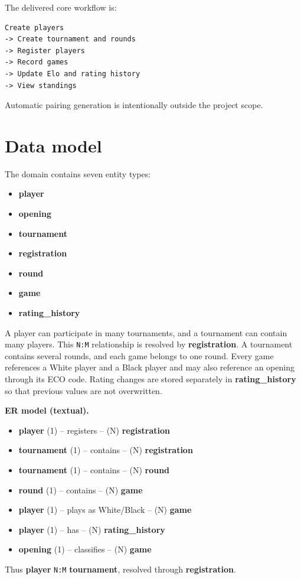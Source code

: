 \documentclass[11pt,a4paper]{article}
\begin{document}
The delivered core workflow is:

\begin{verbatim}
Create players
-> Create tournament and rounds
-> Register players
-> Record games
-> Update Elo and rating history
-> View standings
\end{verbatim}

Automatic pairing generation is intentionally outside the project scope.

\section{Data model}

The domain contains seven entity types:

\begin{itemize}[leftmargin=1.4em, topsep=2pt]
  \item \textbf{player}
  \item \textbf{opening}
  \item \textbf{tournament}
  \item \textbf{registration}
  \item \textbf{round}
  \item \textbf{game}
  \item \textbf{rating\_history}
\end{itemize}

A player can participate in many tournaments, and a tournament can contain many
players. This \texttt{N:M} relationship is resolved by
\textbf{registration}. A tournament contains several rounds, and each game
belongs to one round. Every game references a White player and a Black player
and may also reference an opening through its ECO code. Rating changes are
stored separately in \textbf{rating\_history} so that previous values are not
overwritten.

\begin{beispielbox}
\textbf{ER model (textual).}

\begin{itemize}[leftmargin=1.4em, topsep=2pt]
  \item \textbf{player} (1) -- registers -- (N) \textbf{registration}
  \item \textbf{tournament} (1) -- contains -- (N) \textbf{registration}
  \item \textbf{tournament} (1) -- contains -- (N) \textbf{round}
  \item \textbf{round} (1) -- contains -- (N) \textbf{game}
  \item \textbf{player} (1) -- plays as White/Black -- (N) \textbf{game}
  \item \textbf{player} (1) -- has -- (N) \textbf{rating\_history}
  \item \textbf{opening} (1) -- classifies -- (N) \textbf{game}
\end{itemize}

Thus \textbf{player} \texttt{N:M} \textbf{tournament}, resolved through
\textbf{registration}.
\end{beispielbox}
\end{document}
